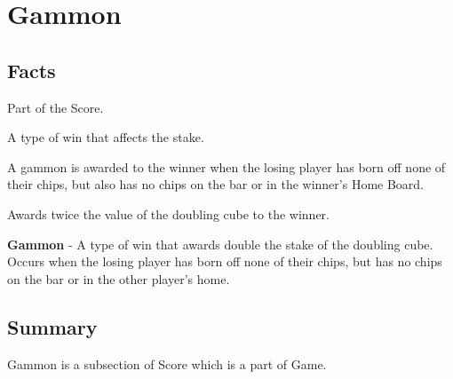 
\section{Gammon}

\subsection{Facts}

\begin{dashed}
    \item Part of the Score.
    \item A type of win that affects the stake.
    \item A gammon is awarded to the winner when the losing player has born off none of their
        chips, but also has no chips on the bar or in the winner's Home Board.
    \item Awards twice the value of the doubling cube to the winner.
\end{dashed}

\noindent
\newline\textbf{Gammon} - A type of win that awards double the stake of the
doubling cube. Occurs when the losing player has born off none of their
chips, but has no chips on the bar or in the other player's home.

\subsection{Summary}
Gammon is a subsection of Score which is a part of Game.
